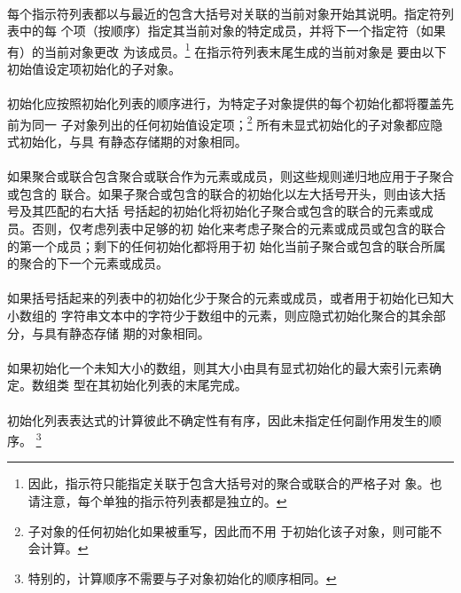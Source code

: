 \paragraph{}
每个指示符列表都以与最近的包含大括号对关联的当前对象开始其说明。指定符列表中的每
个项（按顺序）指定其当前对象的特定成员，并将下一个指定符（如果有）的当前对象更改
为该成员。\footnote{因此，指示符只能指定关联于包含大括号对的聚合或联合的严格子对
象。也请注意，每个单独的指示符列表都是独立的。} 在指示符列表末尾生成的当前对象是
要由以下初始值设定项初始化的子对象。

\paragraph{}
初始化应按照初始化列表的顺序进行，为特定子对象提供的每个初始化都将覆盖先前为同一
子对象列出的任何初始值设定项；\footnote{子对象的任何初始化如果被重写，因此而不用
于初始化该子对象，则可能不会计算。} 所有未显式初始化的子对象都应隐式初始化，与具
有静态存储期的对象相同。

\paragraph{}
如果聚合或联合包含聚合或联合作为元素或成员，则这些规则递归地应用于子聚合或包含的
联合。如果子聚合或包含的联合的初始化以左大括号开头，则由该大括号及其匹配的右大括
号括起的初始化将初始化子聚合或包含的联合的元素或成员。否则，仅考虑列表中足够的初
始化来考虑子聚合的元素或成员或包含的联合的第一个成员；剩下的任何初始化都将用于初
始化当前子聚合或包含的联合所属的聚合的下一个元素或成员。

\paragraph{}
如果括号括起来的列表中的初始化少于聚合的元素或成员，或者用于初始化已知大小数组的
字符串文本中的字符少于数组中的元素，则应隐式初始化聚合的其余部分，与具有静态存储
期的对象相同。

\paragraph{}
如果初始化一个未知大小的数组，则其大小由具有显式初始化的最大索引元素确定。数组类
型在其初始化列表的末尾完成。

\paragraph{}
初始化列表表达式的计算彼此不确定性有有序，因此未指定任何副作用发生的顺序。
\footnote{特别的，计算顺序不需要与子对象初始化的顺序相同。}

